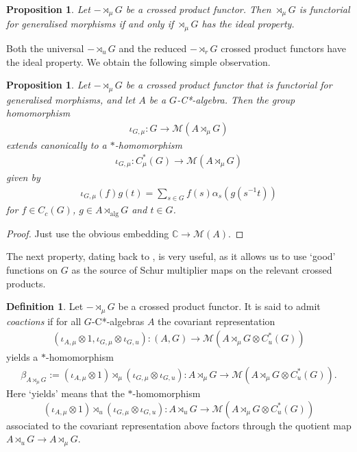 \documentclass[12pt]{amsart}
\newtheorem{prop}[thm]{Proposition}
\theoremstyle{definition}
\newtheorem{defn}[thm]{Definition}
\theoremstyle{remark}
\numberwithin{equation}{section}
\begin{document}
\begin{prop}\cite[Lemma 3.3]{BEW}
	Let $-\rtimes_\mu G$ be a crossed product functor. Then $\rtimes_\mu G$ is functorial
	for generalised morphisms if and only if $\rtimes_\mu G$ has the ideal property.

\end{prop}
Both the universal $-\rtimes_u G$ and the reduced $-\rtimes_r G$ crossed product
	functors have the ideal property. We obtain the following simple observation.
\begin{prop}
	Let $-\rtimes_\mu G$ be a crossed product functor that is functorial for generalised morphisms,
and let	$A$ be a $G$-C*-algebra. Then the group homomorphism
	\begin{align*}
		\iota_{G,\mu}\colon G \to \mathcal{M}(A\rtimes_\mu G)
	\end{align*}
	extends canonically to a $*$-homomorphism
	\begin{align*}
		\iota_{G,\mu}\colon C_\mu^*(G) \to \mathcal{M}(A\rtimes_\mu G)
	\end{align*}
	given by
	\begin{align*}
		\iota_{G,\mu}(f) g(t) = \sum_{s \in G} f(s)\alpha_s(g(s^{-1}t))
	\end{align*}
	for $f\in C_c(G)$, $g\in A\rtimes_{\mathrm{alg}}G$ and $t\in G$.
\end{prop}
\begin{proof}
	Just use the obvious embedding $\mathbb{C}\to \mathcal{M}(A)$.
\end{proof}


The next property, dating back to \cite{KLQNYJM}, is very useful, as it allows us to use `good' functions on $G$ as the source of Schur multiplier maps on the relevant crossed products.

\begin{defn}
	Let $-\rtimes_\mu G$ be a crossed product functor. It is said to
	admit \emph{coactions} if for all $G$-C*-algebras $A$ the covariant representation
	\begin{align*}
		(\iota_{A,\mu}\otimes 1, \iota_{G,\mu}\otimes \iota_{G,u})\colon (A,G) \to
		\mathcal{M}(A\rtimes_\mu G \otimes C^*_u(G))
	\end{align*}
	yields a $*$-homomorphism
	\begin{align*}
	\beta_{A\rtimes_\mu G}:=	(\iota_{A,\mu}\otimes 1) \rtimes_\mu (\iota_{G,\mu}\otimes \iota_{G,u})\colon
		A\rtimes_\mu G \to \mathcal{M}(A\rtimes_\mu G \otimes C^*_u(G)).
	\end{align*}
 Here `yields' means that the $*$-homomorphism
	 $$(\iota_{A,\mu}\otimes 1) \rtimes_u (\iota_{G,\mu}\otimes \iota_{G,u})\colon
	A\rtimes_u G \to \mathcal{M}(A\rtimes_\mu G \otimes C^*_u(G))$$ associated to
	the covariant representation above factors through the quotient map
	$A\rtimes_u G \to A\rtimes_\mu G$.
\end{defn}
\end{document}
